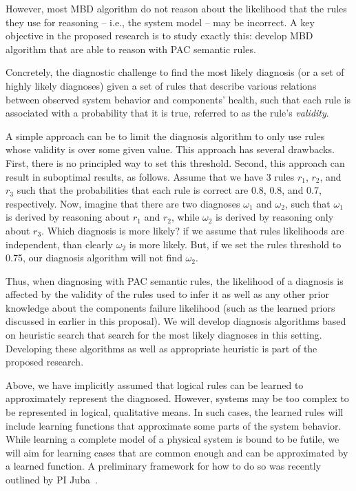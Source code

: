 \documentclass[12pt]{article}
\begin{document}
However, most MBD algorithm do not reason about the likelihood that the rules they use for reasoning -- i.e., the system model -- may be incorrect. A key objective in the proposed research is to study exactly this: develop MBD algorithm that are able to reason with PAC 
semantic rules. 

Concretely, the diagnostic challenge to find the most likely diagnosis (or a set of highly likely diagnoses) given a set of rules that describe various relations between observed system behavior and components' health, such that each rule is associated with a probability that it is true, referred to as the rule's {\em validity}. 

A simple approach can be to limit the diagnosis algorithm to only use rules whose validity is over some given value. This approach has several drawbacks. First, there is no principled way to set this threshold. Second, this approach can result in suboptimal results, as follows. 
Assume that we have 3 rules $r_1$, $r_2$, and $r_3$ such that the probabilities that each rule is correct are 0.8, 0.8, and 0.7, respectively. 
Now, imagine that there are two diagnoses $\omega_1$ and $\omega_2$, such that $\omega_1$ is derived by reasoning about $r_1$ and $r_2$, while $\omega_2$ is derived by reasoning only about $r_3$. Which diagnosis is more likely? 
if we assume that rules likelihoods are independent, than clearly $\omega_2$ is more likely. But, if we set the rules threshold to 0.75, our diagnosis algorithm will not find $\omega_2$. 

Thus, when diagnosing with PAC semantic rules,  the likelihood of a diagnosis is affected by  the validity of the rules used to infer it as well as any other prior knowledge about the components failure likelihood (such as the learned priors discussed in earlier in this proposal). We will develop diagnosis algorithms based on heuristic search that search for the most likely diagnoses in this setting. Developing these algorithms as well as appropriate heuristic is part of the proposed research. 


Above, we have implicitly assumed that logical rules can be learned to approximately represent the  diagnosed. However, systems may be too complex to be represented in logical, qualitative means. In such cases, the learned rules will include learning functions that approximate some parts of the system behavior. While learning a complete model of a physical system is bound to be futile, we will aim for learning cases that are common enough and can be approximated by a learned function. A preliminary framework for how to do so was recently outlined by PI Juba~\cite{juba2016aaai,juba2016conditional}.
\end{document}
